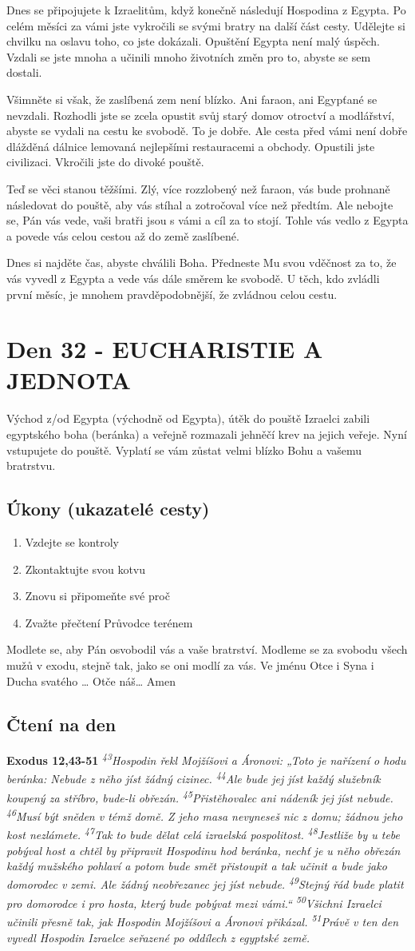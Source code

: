 \documentclass[11pt]{article}
\newcommand{\zacatekPatyTyden}{
  Východ z/od Egypta (východně od Egypta), útěk do pouště \newline
  Izraelci zabili egyptského boha (beránka) a veřejně rozmazali jehněčí krev na jejich veřeje. Nyní vstupujete
  do pouště. Vyplatí se vám zůstat velmi blízko Bohu a vašemu bratrstvu.

\subsection*{Úkony (ukazatelé cesty)}
\begin{enumerate}
  \item Vzdejte se kontroly
  \item Zkontaktujte svou kotvu
  \item Znovu si připomeňte své proč
  \item Zvažte přečtení Průvodce terénem
\end{enumerate}
Modlete se, aby Pán osvobodil vás a vaše bratrství. \newline
Modleme se za svobodu všech mužů v exodu, stejně tak, jako se oni modlí za vás.\newline
Ve jménu Otce i Syna i Ducha svatého …  Otče náš… Amen
}
\begin{document}
Dnes se připojujete k Izraelitům, když konečně následují Hospodina z Egypta. Po celém měsíci za vámi jste vykročili
se svými bratry na další část cesty. Udělejte si chvilku na oslavu toho, co jste dokázali. Opuštění Egypta není malý
úspěch. Vzdali se jste mnoha a učinili mnoho životních změn pro to, abyste se sem dostali.

Všimněte si však, že zaslíbená zem není blízko. Ani faraon, ani Egypťané se nevzdali. Rozhodli jste se zcela opustit
svůj starý domov otroctví a modlářství, abyste se vydali na cestu ke svobodě. To je dobře. Ale cesta před vámi není
dobře dlážděná dálnice lemovaná nejlepšími restauracemi a obchody. Opustili jste civilizaci. Vkročili jste do divoké
pouště.

Teď se věci stanou těžšími. Zlý, více rozzlobený než faraon, vás bude prohnaně následovat do pouště, aby vás stíhal a
zotročoval více než předtím. Ale nebojte se, Pán vás vede, vaši bratři jsou s vámi a cíl za to stojí. Tohle vás vedlo
z Egypta a povede vás celou cestou až do země zaslíbené.

Dnes si najděte čas, abyste chválili Boha. Předneste Mu svou vděčnost za to, že vás vyvedl z Egypta a vede vás dále
směrem ke svobodě. U těch, kdo zvládli první měsíc, je mnohem pravděpodobnější, že zvládnou celou cestu.

\newpage
\section{Den 32 - EUCHARISTIE A JEDNOTA}
\zacatekPatyTyden
\subsection*{Čtení na den}
\textbf{Exodus 12,43-51}
\newline
\textit{
\textsuperscript{43}Hospodin řekl Mojžíšovi a Áronovi: „Toto je nařízení o hodu beránka: Nebude z něho jíst žádný cizinec.
\textsuperscript{44}Ale bude jej jíst každý služebník koupený za stříbro, bude-li obřezán.
\textsuperscript{45}Přistěhovalec ani nádeník jej jíst nebude.
\textsuperscript{46}Musí být sněden v témž domě. Z jeho masa nevyneseš nic z domu; žádnou jeho kost nezlámete.
\textsuperscript{47}Tak to bude dělat celá izraelská pospolitost.
\textsuperscript{48}Jestliže by u tebe pobýval host a chtěl by připravit Hospodinu hod beránka, nechť je u něho obřezán každý mužského pohlaví a potom bude smět přistoupit a tak učinit a bude jako domorodec v zemi. Ale žádný neobřezanec jej jíst nebude.
\textsuperscript{49}Stejný řád bude platit pro domorodce i pro hosta, který bude pobývat mezi vámi.“
\textsuperscript{50}Všichni Izraelci učinili přesně tak, jak Hospodin Mojžíšovi a Áronovi přikázal.
\textsuperscript{51}Právě v ten den vyvedl Hospodin Izraelce seřazené po oddílech z egyptské země.
}
\end{document}
